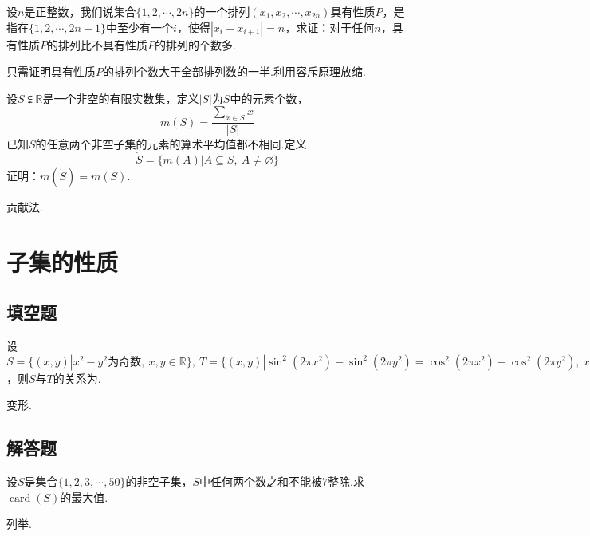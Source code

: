 \documentclass[lang=cn, zihao=4.5]{elegantbook}
\newcommand{\tk}{\uline{\hspace{4em}}}
\newcommand{\R}{\mathbb{R}}
\DeclareMathOperator{\card}{card}
\begin{document}
\begin{example} %
	设$n$是正整数，我们说集合$\{ 1,2, \cdots ,2n \}$的一个排列$(x_1,x_2, \cdots ,x_{2n})$具有性质$P$，是指在$\{ 1,2, \cdots ,2n-1 \}$中至少有一个$i$，使得$|x_i-x_{i+1}|=n$，求证：对于任何$n$，具有性质$P$的排列比不具有性质$P$的排列的个数多.
\end{example}
\begin{hint}
	只需证明具有性质$P$的排列个数大于全部排列数的一半.利用容斥原理放缩.
\end{hint}

\begin{example} %
	设$S \subsetneqq \mathbb{R}$是一个非空的有限实数集，定义$|S|$为$S$中的元素个数，$$m(S) = \frac{\sum_{x \in S} x}{|S|}$$
	已知$S$的任意两个非空子集的元素的算术平均值都不相同.定义$$\dot{S} = \{ m(A) | A \subseteq S, ~A \neq \varnothing \}$$
	证明：$m(\dot{S}) = m(S)$.
\end{example}
\begin{hint}
	贡献法.
\end{hint}

\newpage
\section{子集的性质}

\subsection*{填空题}

\begin{example} %
	设$S=\{ (x,y)|x^2-y^2 \text{为奇数},~x,y \in \R \},~ T=\{ (x,y)|\sin ^2 (2\pi x^2) - \sin ^2 (2\pi y^2) = \cos ^2 (2\pi x^2) - \cos ^2 (2\pi y^2),~ x,y \in \R \}$，则$S$与$T$的关系为\tk .
\end{example}
\begin{hint}
	变形.
\end{hint}

\subsection*{解答题}

\begin{example} %
	设$S$是集合$\{ 1,2,3,\cdots ,50 \}$的非空子集，$S$中任何两个数之和不能被$7$整除.求$\card (S)$的最大值.
\end{example}
\begin{hint}
	列举.
\end{hint}
\end{document}
